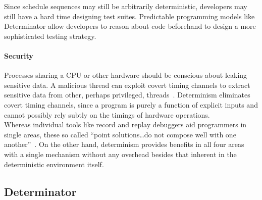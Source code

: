 Since schedule sequences may still be arbitrarily deterministic, developers may
still have a hard time designing test suites. Predictable programming models
like Determinator allow developers to reason about code beforehand
to design a more sophisticated testing strategy.

\paragraph{Security} Processes sharing a CPU or other hardware should be
conscious about leaking sensitive data. A malicious thread can exploit covert
timing channels to extract sensitive data from other, perhaps privileged,
threads~\cite{Aviram10cloud}. Determinism eliminates covert timing channels,
since a program is purely a function of explicit inputs and cannot possibly rely
subtly on the timings of hardware operations.
\\

\iffalse
We also note the importance of repeatability in simulators.
Physicists rely on repeatability of simulated experiments to verify results,
and video game developers often benefit from repeatable physics engines.
\fi

Whereas individual tools like record and replay debuggers aid programmers in
single areas, these so called ``point solutions\ldots do not compose well with
one another''~\cite{Bergan11}. On the other hand, determinism provides benefits
in all four areas with a single mechanism without any overhead besides that
inherent in the deterministic environment itself.

\iffalse
To further motivate determinism, we consider ``point solutions'' that
solve problems in single areas at
once. Record and replay debuggers, like Leblanc et al.'s Instant Replay
system, aid in debugging parallel programs by logging scheduling sequences and
other relevant interactions in order to replay an execution sequence exactly.
However, these debuggers are costly in terms of storage and performance.
\iffalse Even with replay ability, the execution sequence is still arbitrary and
gives the programmer no intuition about the program's behavior. \fi
In general, these ``point solutions\ldots do not compose well with one
another''~\cite{Bergan11}. On the other hand, determinism provides benefits in
all four areas at once with a single mechanism without any additional overhead
besides that inherent in the deterministic environment.
\fi

\subsection{Determinator}

